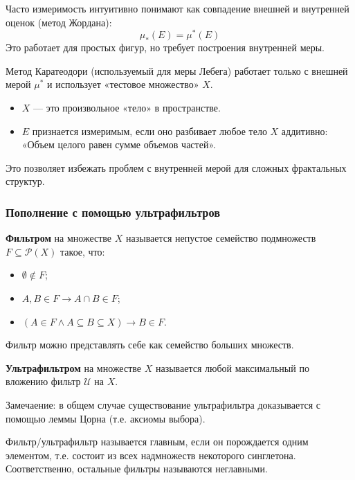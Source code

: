 \documentclass[11pt, a4paper]{extarticle}
\newcommand{\Pcal}{{\mathcal P}}
\begin{document}
\begin{remark}
Часто измеримость интуитивно понимают как совпадение внешней и внутренней оценок (метод Жордана):
$$ \mu_*(E) = \mu^*(E) $$
Это работает для простых фигур, но требует построения внутренней меры.

Метод Каратеодори (используемый для меры Лебега) работает только с внешней мерой $\mu^*$ и использует «тестовое множество» $X$.
\begin{itemize}
    \item $X$ — это произвольное «тело» в пространстве.
    \item $E$ признается измеримым, если оно разбивает любое тело $X$ аддитивно: «Объем целого равен сумме объемов частей».
\end{itemize}
Это позволяет избежать проблем с внутренней мерой для сложных фрактальных структур.
\end{remark}

\subsubsection{Пополнение с помощью ультрафильтров}

\begin{definition}
\textbf{Фильтром} на множестве $X$ называется непустое семейство подмножеств $F \subseteq \Pcal(X)$ такое, что:
\begin{itemize}
    \item $\emptyset \notin F$;
    \item $A, B \in F \to A \cap B \in F$;
    \item $(A \in F \land A \subseteq B \subseteq X) \to B \in F$.
\end{itemize}
\end{definition}

Фильтр можно представлять себе как семейство больших множеств.

\begin{definition}[Ультрафильтр]
\textbf{Ультрафильтром} на множестве $X$ называется любой максимальный по вложению фильтр $\mathcal{U}$ на $X$.

Замечаение: в общем случае существование ультрафильтра доказывается с помощью леммы Цорна (т.е. аксиомы выбора).
\end{definition}

Фильтр/ультрафильтр называется главным, если он порождается одним элементом, т.е. состоит из всех надмножеств некоторого синглетона. Соответственно, остальные фильтры называются неглавными.
\end{document}
